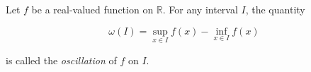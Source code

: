 Let $f$ be a real-valued function on $\mathbb{R}$. For any interval $I$, the quantity

$$\omega(I) = \sup_{x \in I} f(x) - \inf_{x \in I} f(x)$$

is called the \emph{oscillation} of $f$ on $I$.
